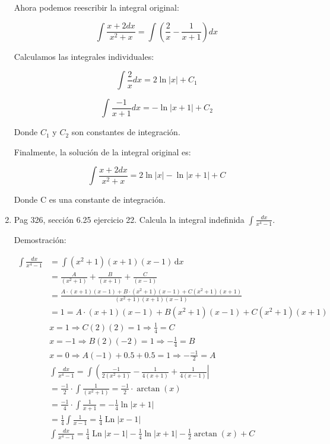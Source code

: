 \documentclass{report}
\begin{document}
\begin{enumerate}
        Ahora podemos reescribir la integral original:
        
        \[
        \int \frac{x+2dx}{x^2+x} = \int \left(\frac{2}{x} - \frac{1}{x+1}\right)dx
        \]
        
        Calculamos las integrales individuales:
        
        \[
        \int \frac{2}{x}dx = 2\ln|x| + C_1
        \]
        
        \[
        \int \frac{-1}{x+1}dx = -\ln|x+1| + C_2
        \]
        
        Donde $C_1$ y $C_2$ son constantes de integración.
        
        Finalmente, la solución de la integral original es:
        
        \[
        \int \frac{x+2dx}{x^2+x} = 2\ln|x| - \ln|x+1| + C
        \]
        
        Donde C es una constante de integración.
        
        \item Pag 326, sección 6.25 ejercicio 22. Calcula la integral indefinida $\int \frac{dx}{x^{4}-1}$.
        
        Demostración:
        
        \[
        \begin{aligned}
        \int \frac{dx}{x^4-1} &= \int \left(x^2+1\right)(x+1)(x-1)\,\mathrm{d}x \\
        &= \frac{A}{\left(x^2+1\right)}+\frac{B}{(x+1)}+\frac{C}{(x-1)} \\
        &= \frac{A \cdot(x+1)(x-1)+B \cdot\left(x^2+1\right)(x-1)+C\left(x^2+1\right)(x+1)}{\left(x^2+1\right)(x+1)(x-1)} \\
        &= 1=A \cdot(x+1)(x-1)+B\left(x^2+1\right)(x-1)+C\left(x^2+1\right)(x+1) \\
        &x=1 \Rightarrow C(2)(2)=1 \Rightarrow \frac{1}{4}=C \\
        &x=-1 \Rightarrow B(2)(-2)=1 \Rightarrow-\frac{1}{4}=B \\
        &x=0 \Rightarrow A(-1)+0.5+0.5=1 \Rightarrow-\frac{-1}{2}=A \\
        &\int \frac{dx}{x^4-1}=\int \left(\left.\frac{-1}{2\left(x^2+1\right)}-\frac{1}{4(x+1)}+\frac{1}{4(x-1)} \right\rvert\,\right. \\
        &=\frac{-1}{2} \cdot \int \frac{1}{\left(x^2+1\right)}=\frac{-1}{2} \cdot \arctan (x) \\
        &=\frac{-1}{4} \cdot \int \frac{1}{x+1}=-\frac{1}{4} \ln |x+1| \\
        &=\frac{1}{4} \int \frac{1}{x-1}=\frac{1}{4} \operatorname{Ln}|x-1| \\
        &\int \frac{dx}{x^4-1}=\frac{1}{4} \operatorname{Ln}|x-1|-\frac{1}{4} \ln |x+1|-\frac{1}{2} \arctan (x)+C
        \end{aligned}
        \]
        

\end{enumerate}
\end{document}
